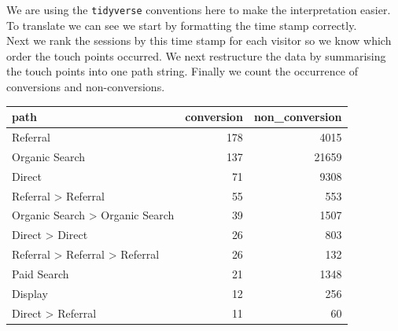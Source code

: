 \documentclass[]{book}
\newenvironment{Shaded}{\begin{snugshade}}{\end{snugshade}}
\newcommand{\DataTypeTok}[1]{\textcolor[rgb]{0.13,0.29,0.53}{#1}}
\newcommand{\DecValTok}[1]{\textcolor[rgb]{0.00,0.00,0.81}{#1}}
\newcommand{\KeywordTok}[1]{\textcolor[rgb]{0.13,0.29,0.53}{\textbf{#1}}}
\newcommand{\NormalTok}[1]{#1}
\newcommand{\OperatorTok}[1]{\textcolor[rgb]{0.81,0.36,0.00}{\textbf{#1}}}
\newcommand{\StringTok}[1]{\textcolor[rgb]{0.31,0.60,0.02}{#1}}
\begin{document}
We are using the \texttt{tidyverse} conventions here to make the interpretation
easier. To translate we can see we start by formatting the time stamp correctly.\\
Next we rank the sessions by this time stamp for each visitor so we know which
order the touch points occurred. We next restructure the data by summarising
the touch points into one path string. Finally we count the occurrence of conversions and
non-conversions.

\begin{Shaded}
\end{Shaded}

\begin{tabular}{l|r|r}
\hline
path & conversion & non\_conversion\\
\hline
Referral & 178 & 4015\\
\hline
Organic Search & 137 & 21659\\
\hline
Direct & 71 & 9308\\
\hline
Referral > Referral & 55 & 553\\
\hline
Organic Search > Organic Search & 39 & 1507\\
\hline
Direct > Direct & 26 & 803\\
\hline
Referral > Referral > Referral & 26 & 132\\
\hline
Paid Search & 21 & 1348\\
\hline
Display & 12 & 256\\
\hline
Direct > Referral & 11 & 60\\
\hline
\end{tabular}
\end{document}

